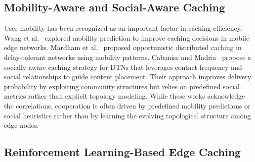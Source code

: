 \subsection{Mobility-Aware and Social-Aware Caching}

User mobility has been recognized as an important factor in caching efficiency. Wang et al.~\cite{Wang2017Mobility} explored mobility prediction to improve caching decisions in mobile edge networks. Mardham et al.~\cite{Mardham2018} proposed opportunistic distributed caching in delay-tolerant networks using mobility patterns. Cabaniss and Madria~\cite{Cabaniss2014} propose a socially-aware caching strategy for DTNs that leverages contact frequency and social relationships to guide content placement. Their approach improves delivery probability by exploiting community structures but relies on predefined social metrics rather than explicit topology modeling.
While these works acknowledge the correlations, cooperation is often driven by predefined mobility predictions or social heuristics rather than by learning the evolving topological structure among edge nodes.

\subsection{Reinforcement Learning-Based Edge Caching}

